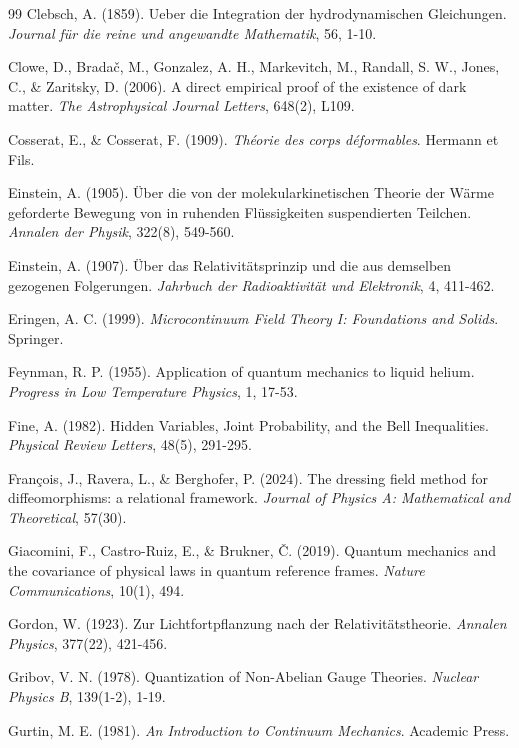 \begin{thebibliography}{99}
Clebsch, A. (1859). Ueber die Integration der hydrodynamischen Gleichungen. \textit{Journal f\"{u}r die reine und angewandte Mathematik}, 56, 1-10.

Clowe, D., Brada\v{c}, M., Gonzalez, A. H., Markevitch, M., Randall, S. W., Jones, C., \& Zaritsky, D. (2006). A direct empirical proof of the existence of dark matter. \textit{The Astrophysical Journal Letters}, 648(2), L109.

Cosserat, E., \& Cosserat, F. (1909). \textit{Th\'{e}orie des corps d\'{e}formables}. Hermann et Fils.

Einstein, A. (1905). \"{U}ber die von der molekularkinetischen Theorie der W\"{a}rme geforderte Bewegung von in ruhenden Fl\"{u}ssigkeiten suspendierten Teilchen. \textit{Annalen der Physik}, 322(8), 549-560.

Einstein, A. (1907). \"{U}ber das Relativit\"{a}tsprinzip und die aus demselben gezogenen Folgerungen. \textit{Jahrbuch der Radioaktivit\"{a}t und Elektronik}, 4, 411-462.

Eringen, A. C. (1999). \textit{Microcontinuum Field Theory I: Foundations and Solids}. Springer.

Feynman, R. P. (1955). Application of quantum mechanics to liquid helium. \textit{Progress in Low Temperature Physics}, 1, 17-53.

Fine, A. (1982). Hidden Variables, Joint Probability, and the Bell Inequalities. \textit{Physical Review Letters}, 48(5), 291-295.

Fran\c{c}ois, J., Ravera, L., \& Berghofer, P. (2024). The dressing field method for diffeomorphisms: a relational framework. \textit{Journal of Physics A: Mathematical and Theoretical}, 57(30).

Giacomini, F., Castro-Ruiz, E., \& Brukner, \v{C}. (2019). Quantum mechanics and the covariance of physical laws in quantum reference frames. \textit{Nature Communications}, 10(1), 494.

Gordon, W. (1923). Zur Lichtfortpflanzung nach der Relativit\"{a}tstheorie. \textit{Annalen Physics}, 377(22), 421-456.

Gribov, V. N. (1978). Quantization of Non-Abelian Gauge Theories. \textit{Nuclear Physics B}, 139(1-2), 1-19.

Gurtin, M. E. (1981). \textit{An Introduction to Continuum Mechanics}. Academic Press.


\end{thebibliography}
